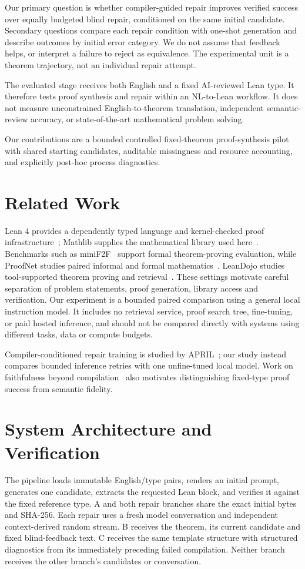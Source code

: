 \documentclass[runningheads,a4paper]{llncs}
\begin{document}
Our primary question is whether compiler-guided repair improves verified
success over equally budgeted blind repair, conditioned on the same initial
candidate. Secondary questions compare each repair condition with one-shot
generation and describe outcomes by initial error category. We do not assume
that feedback helps, or interpret a failure to reject as equivalence. The
experimental unit is a theorem trajectory, not an individual repair attempt.

The evaluated stage receives both English and a fixed AI-reviewed Lean type.
It therefore tests proof synthesis and repair within an NL-to-Lean workflow.
It does not measure unconstrained English-to-theorem translation, independent
semantic-review accuracy, or state-of-the-art mathematical problem solving.

Our contributions are a bounded controlled fixed-theorem proof-synthesis
pilot with shared starting candidates, auditable missingness and resource
accounting, and explicitly post-hoc process diagnostics.

\section{Related Work}
Lean 4 provides a dependently typed language and kernel-checked proof
infrastructure~\cite{demoura2021lean4}; Mathlib supplies the mathematical
library used here~\cite{mathlib2020}. Benchmarks such as
miniF2F~\cite{zheng2022minif2f} support formal theorem-proving evaluation,
while ProofNet studies paired informal and formal
mathematics~\cite{azerbayev2023proofnet}. LeanDojo studies tool-supported
theorem proving and retrieval~\cite{yang2023leandojo}. These settings motivate
careful separation of problem statements, proof generation, library access and
verification. Our experiment is a bounded paired comparison using a general
local instruction model. It includes no retrieval service, proof search tree,
fine-tuning, or paid hosted inference, and should not be compared directly with
systems using different tasks, data or compute budgets.

Compiler-conditioned repair training is studied by APRIL~\cite{wang2026april};
our study instead compares bounded inference retries with one unfine-tuned local
model. Work on faithfulness beyond compilation~\cite{zhang2026beyond} also
motivates distinguishing fixed-type proof success from semantic fidelity.

\section{System Architecture and Verification}
The pipeline loads immutable English/type pairs, renders an initial prompt,
generates one candidate, extracts the requested Lean block, and verifies it
against the fixed reference type. A and both repair branches share the exact
initial bytes and SHA-256. Each repair uses a fresh model conversation and
independent context-derived random stream. B receives the theorem, its current
candidate and fixed blind-feedback text. C receives the same template structure
with structured diagnostics from its immediately preceding failed compilation.
Neither branch receives the other branch's candidates or conversation.
\end{document}

